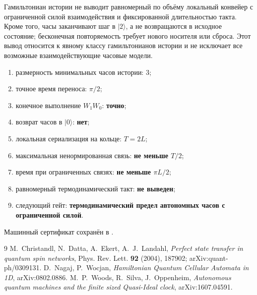 \begin{nogocriterion}
Гамильтониан истории не выводит равномерный по объёму локальный конвейер с
ограниченной силой взаимодействия и фиксированной длительностью такта.
Кроме того, часы заканчивают шаг в $|2\rangle$, а не возвращаются в исходное
состояние; бесконечная повторяемость требует нового носителя или сброса.
Этот вывод относится к явному классу гамильтонианов истории и не исключает
все возможные взаимодействующие часовые модели.
\end{nogocriterion}

\begin{protocol}
\begin{enumerate}
 \item размерность минимальных часов истории: \textbf{$3$};
 \item точное время переноса: \textbf{$\pi/2$};
 \item конечное выполнение $W_1W_0$: \textbf{точно};
 \item возврат часов в $|0\rangle$: \textbf{нет};
 \item локальная сериализация на кольце: \textbf{$T=2L$};
 \item максимальная ненормированная связь: \textbf{не меньше $T/2$};
 \item время при ограниченных связях: \textbf{не меньше $\pi L/2$};
 \item равномерный термодинамический такт: \textbf{не выведен};
 \item следующий гейт: \textbf{термодинамический предел автономных часов с ограниченной силой}.
\end{enumerate}
\end{protocol}

Машинный сертификат сохранён в
.

\begin{thebibliography}{9}
M.~Christandl, N.~Datta, A.~Ekert, A.~J.~Landahl,
\emph{Perfect state transfer in quantum spin networks},
Phys. Rev. Lett. \textbf{92} (2004), 187902; arXiv:quant-ph/0309131.
D.~Nagaj, P.~Wocjan,
\emph{Hamiltonian Quantum Cellular Automata in 1D}, arXiv:0802.0886.
M.~P.~Woods, R.~Silva, J.~Oppenheim,
\emph{Autonomous quantum machines and the finite sized Quasi-Ideal clock},
arXiv:1607.04591.
\end{thebibliography}